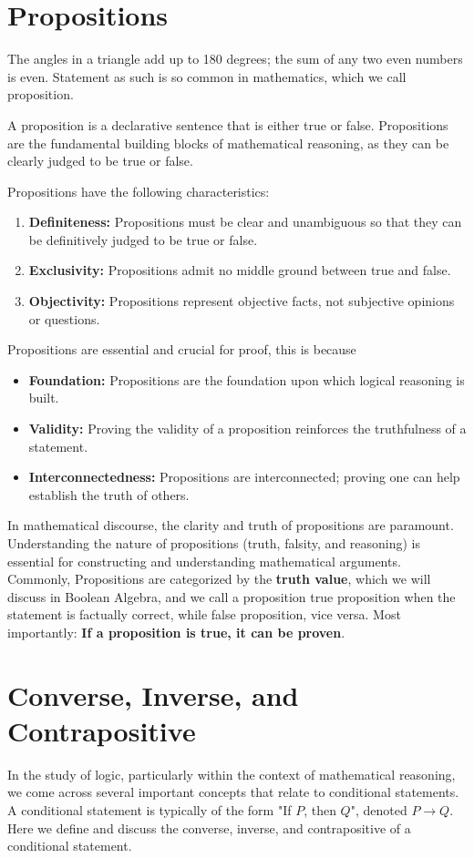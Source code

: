 \documentclass[
	12pt, %
	fleqn, %
	a4paper, %
]{LegrandOrangeBook}
\begin{document}
\section{Propositions}
The angles in a triangle add up to 180 degrees; the sum of any two even numbers is even. Statement as such is so common in mathematics, which we call proposition.
	\begin{definition}[Proposition]
		A proposition is a declarative sentence that is either true or false. 
		Propositions are the fundamental building blocks of mathematical reasoning, as they can be clearly judged to be true or false.
	\end{definition}
	Propositions have the following characteristics:
	\begin{enumerate}
		\item \textbf{Definiteness:} Propositions must be clear and unambiguous so that they can be definitively judged to be true or false.
		\item \textbf{Exclusivity:} Propositions admit no middle ground between true and false.
		\item \textbf{Objectivity:} Propositions represent objective facts, not subjective opinions or questions.
	\end{enumerate}

\noindent	Propositions are essential and crucial for proof, this is because
	\begin{itemize}
		\item \textbf{Foundation:} Propositions are the foundation upon which logical reasoning is built.
		\item \textbf{Validity:} Proving the validity of a proposition reinforces the truthfulness of a statement.
		\item \textbf{Interconnectedness:} Propositions are interconnected; proving one can help establish the truth of others.
	\end{itemize}

	In mathematical discourse, the clarity and truth of propositions are paramount. Understanding the nature of propositions (truth, falsity, and reasoning) is essential for constructing and understanding mathematical arguments.	
Commonly, Propositions are categorized by the \textbf{truth value}, which we will discuss
in Boolean Algebra, and we call a proposition true proposition when the statement is factually correct, while false
proposition, vice versa. Most importantly: \textbf{If a proposition is true, it can be proven}.
\section*{Converse, Inverse, and Contrapositive}
In the study of logic, particularly within the context of mathematical reasoning, we come across several important concepts that relate to conditional statements. A conditional statement is typically of the form "If \(P\), then \(Q\)", denoted \(P \rightarrow Q\). Here we define and discuss the converse, inverse, and contrapositive of a conditional statement.
\end{document}
